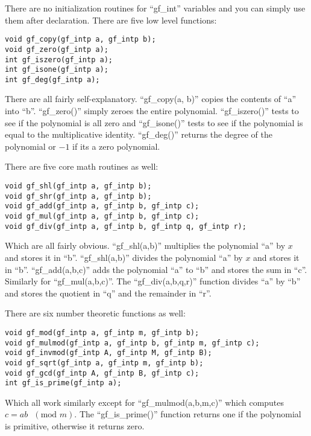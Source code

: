 \documentclass{book}
\begin{document}
There are no initialization routines for ``gf\_int'' variables and you can simply use them after declaration.  There are five
low level functions:
    
\begin{verbatim}
void gf_copy(gf_intp a, gf_intp b);
void gf_zero(gf_intp a);
int gf_iszero(gf_intp a);
int gf_isone(gf_intp a);
int gf_deg(gf_intp a);
\end{verbatim}
There are all fairly self-explanatory.  ``gf\_copy(a, b)'' copies the contents of ``a'' into ``b''.  ``gf\_zero()'' simply
zeroes the entire polynomial.  ``gf\_iszero()'' tests to see if the polynomial is all zero and ``gf\_isone()'' tests to see
if the polynomial is equal to the multiplicative identity.  ``gf\_deg()'' returns the degree of the polynomial or $-1$ if its
a zero polynomial.

There are five core math routines as well:
     
\begin{verbatim}
void gf_shl(gf_intp a, gf_intp b);
void gf_shr(gf_intp a, gf_intp b);
void gf_add(gf_intp a, gf_intp b, gf_intp c);
void gf_mul(gf_intp a, gf_intp b, gf_intp c);
void gf_div(gf_intp a, gf_intp b, gf_intp q, gf_intp r);
\end{verbatim}

Which are all fairly obvious.  ``gf\_shl(a,b)'' multiplies the polynomial ``a'' by $x$ and stores it in ``b''.  
``gf\_shl(a,b)'' divides the polynomial ``a'' by $x$ and stores it in ``b''.  ``gf\_add(a,b,c)'' adds the polynomial
``a'' to ``b'' and stores the sum in ``c''.  Similarly for ``gf\_mul(a,b,c)''.  The ``gf\_div(a,b,q,r)'' function divides
``a'' by ``b'' and stores the quotient in ``q'' and the remainder in ``r''.

There are six number theoretic functions as well:
     
\begin{verbatim}
void gf_mod(gf_intp a, gf_intp m, gf_intp b);
void gf_mulmod(gf_intp a, gf_intp b, gf_intp m, gf_intp c);
void gf_invmod(gf_intp A, gf_intp M, gf_intp B);
void gf_sqrt(gf_intp a, gf_intp m, gf_intp b);
void gf_gcd(gf_intp A, gf_intp B, gf_intp c);
int gf_is_prime(gf_intp a);
\end{verbatim}

Which all work similarly except for  ``gf\_mulmod(a,b,m,c)'' which computes $c = ab\mbox{ }(\mbox{mod }m)$.  The 
``gf\_is\_prime()'' function returns one if the polynomial is primitive, otherwise it returns zero.
\end{document}
